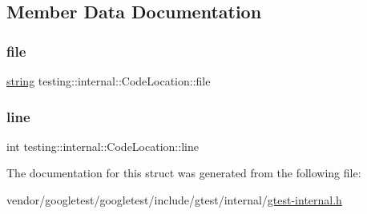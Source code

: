 \subsection{Member Data Documentation}
\mbox{\label{structtesting_1_1internal_1_1_code_location_ab8a24d5e63295e411d37578dbb9427c0}} 
\subsubsection{\texorpdfstring{file}{file}}
{\footnotesize\ttfamily \hyperlink{namespacetesting_1_1internal_a8e8ff5b11e64078831112677156cb111}{string} testing\+::internal\+::\+Code\+Location\+::file}

\mbox{\label{structtesting_1_1internal_1_1_code_location_a01c977c7e8834a05a6d6c40b0c416045}} 
\subsubsection{\texorpdfstring{line}{line}}
{\footnotesize\ttfamily int testing\+::internal\+::\+Code\+Location\+::line}



The documentation for this struct was generated from the following file\+:\begin{DoxyCompactItemize}
\item 
vendor/googletest/googletest/include/gtest/internal/\hyperlink{gtest-internal_8h}{gtest-\/internal.\+h}\end{DoxyCompactItemize}
